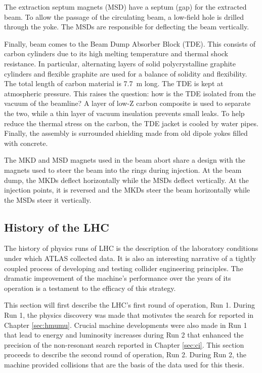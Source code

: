 The extraction septum magnets (MSD) have a septum (gap) for the extracted beam.
To allow the passage of the circulating beam, a low-field hole is drilled through the yoke.
The MSDs are responsible for deflecting the beam vertically.

Finally, beam comes to the Beam Dump Absorber Block (TDE).
This consists of carbon cylinders due to its high melting temperature and thermal shock resistance.
In particular, alternating layers of solid polycrystalline graphite cylinders and flexible graphite are used for a balance of solidity and flexibility.
The total length of carbon material is 7.7~m long.
The TDE is kept at atmospheric pressure. This raises the question: how is the TDE isolated from the vacuum of the beamline? A layer of low-Z carbon composite is used to separate the two, while a thin layer of vacuum insulation prevents small leaks. \cite{beamdump}
To help reduce the thermal stress on the carbon, the TDE jacket is cooled by water pipes.
Finally, the assembly is surrounded shielding made from old dipole yokes filled with concrete.

The MKD and MSD magnets used in the beam abort share a design with the magnets used to steer the beam into the rings during injection.
At the beam dump, the MKDs deflect horizontally while the MSDs deflect vertically.
At the injection points, it is reversed and the MKDs steer the beam horizontally while the MSDs steer it vertically.


\subsection{History of the LHC}
The history of physics runs of LHC is the description of the laboratory conditions under which ATLAS collected data.
It is also an interesting narrative of a tightly coupled process of developing and testing collider engineering principles.
The dramatic improvement of the machine's performance over the years of its operation is a testament to the efficacy of this strategy.

This section will first describe the LHC's first round of operation, Run 1.
During Run 1, the physics discovery was made that motivates the search for \vhmm reported in Chapter \ref{sec:hmumu}.
Crucial machine developments were also made in Run 1 that lead to energy and luminosity increases during Run 2 that enhanced the precision of the non-resonant search reported in Chapter \ref{sec:ci}.
This section proceeds to describe the second round of operation, Run 2.
During Run 2, the machine provided collisions that are the basis of the data used for this thesis.

